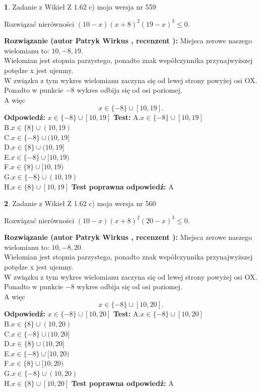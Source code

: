 \documentclass[12pt, a4paper]{article}
\theoremstyle{definition} %
\newtheorem{zad}{}
\newcommand{\zadStart}[1]{\begin{zad}#1\newline}
\newcommand{\zadStop}{\end{zad}}
\newcommand{\rozwStart}[2]{\noindent \textbf{Rozwiązanie (autor #1 , recenzent #2): }\newline}
\newcommand{\rozwStop}{\newline}
\newcommand{\odpStart}{\noindent \textbf{Odpowiedź:}\newline}
\newcommand{\odpStop}{\newline}
\newcommand{\testStart}{\noindent \textbf{Test:}\newline}
\newcommand{\testStop}{\newline}
\newcommand{\kluczStart}{\noindent \textbf{Test poprawna odpowiedź:}\newline}
\newcommand{\kluczStop}{\newline}
\begin{document}
\zadStart{Zadanie z Wikieł Z 1.62 c) moja wersja nr 559}

Rozwiązać nierówności $(10-x)(x+8)^{2}(19-x)^{3}\le0$.
\zadStop
\rozwStart{Patryk Wirkus}{}
Miejsca zerowe naszego wielomianu to: $10, -8, 19$.\\
Wielomian jest stopnia parzystego, ponadto znak współczynnika przy\linebreak najwyższej potędze x jest ujemny.\\ W związku z tym wykres wielomianu zaczyna się od lewej strony powyżej osi OX.\\
Ponadto w punkcie $-8$ wykres odbija się od osi poziomej.\\
A więc $$x \in \{-8\} \cup [10,19].$$
\rozwStop
\odpStart
$x \in \{-8\} \cup [10,19]$
\odpStop
\testStart
A.$x \in \{-8\} \cup [10,19]$\\
B.$x \in \{8\} \cup (10,19)$\\
C.$x \in \{-8\} \cup (10,19]$\\
D.$x \in \{8\} \cup (10,19]$\\
E.$x \in \{-8\} \cup [10,19)$\\
F.$x \in \{8\} \cup [10,19)$\\
G.$x \in \{-8\} \cup (10,19)$\\
H.$x \in \{8\} \cup [10,19]$
\testStop
\kluczStart
A
\kluczStop



\zadStart{Zadanie z Wikieł Z 1.62 c) moja wersja nr 560}

Rozwiązać nierówności $(10-x)(x+8)^{2}(20-x)^{3}\le0$.
\zadStop
\rozwStart{Patryk Wirkus}{}
Miejsca zerowe naszego wielomianu to: $10, -8, 20$.\\
Wielomian jest stopnia parzystego, ponadto znak współczynnika przy\linebreak najwyższej potędze x jest ujemny.\\ W związku z tym wykres wielomianu zaczyna się od lewej strony powyżej osi OX.\\
Ponadto w punkcie $-8$ wykres odbija się od osi poziomej.\\
A więc $$x \in \{-8\} \cup [10,20].$$
\rozwStop
\odpStart
$x \in \{-8\} \cup [10,20]$
\odpStop
\testStart
A.$x \in \{-8\} \cup [10,20]$\\
B.$x \in \{8\} \cup (10,20)$\\
C.$x \in \{-8\} \cup (10,20]$\\
D.$x \in \{8\} \cup (10,20]$\\
E.$x \in \{-8\} \cup [10,20)$\\
F.$x \in \{8\} \cup [10,20)$\\
G.$x \in \{-8\} \cup (10,20)$\\
H.$x \in \{8\} \cup [10,20]$
\testStop
\kluczStart
A
\kluczStop
\end{document}
